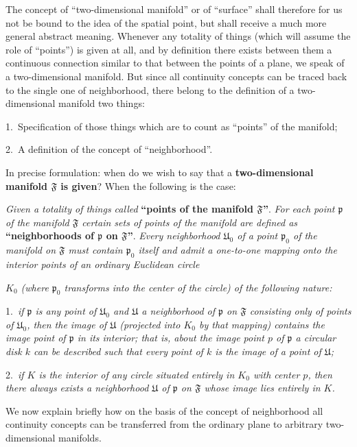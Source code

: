 \documentclass{article}
\begin{document}
The concept of ``two-dimensional manifold'' or of ``surface'' shall therefore for us not be bound to the idea of the spatial point, but shall receive a much more general abstract meaning. Whenever any totality of things (which will assume the role of ``points'') is given at all, and by definition there exists between them a continuous connection similar to that between the points of a plane, we speak of a two-dimensional manifold. But since all continuity concepts can be traced back to the single one of neighborhood, there belong to the definition of a two-dimensional manifold two things:

1.\ Specification of those things which are to count as ``points'' of the manifold;

2.\ A definition of the concept of ``neighborhood''.

In precise formulation: when do we wish to say that a \textbf{two-dimensional manifold $\mathfrak{F}$ is given}? When the following is the case:

\emph{Given a totality of things called} \textbf{``points of the manifold $\mathfrak{F}$''}. \emph{For each point $\mathfrak{p}$ of the manifold $\mathfrak{F}$ certain sets of points of the manifold are defined as} \textbf{``neighborhoods of $\mathfrak{p}$ on $\mathfrak{F}$''}. \emph{Every neighborhood $\mathfrak{U}_0$ of a point $\mathfrak{p}_0$ of the manifold on $\mathfrak{F}$ must contain $\mathfrak{p}_0$ itself and admit a one-to-one mapping onto the interior points of an ordinary Euclidean circle}

\emph{$K_0$ (where $\mathfrak{p}_0$ transforms into the center of the circle) of the following nature:}

1.\ \emph{if $\mathfrak{p}$ is any point of $\mathfrak{U}_0$ and $\mathfrak{U}$ a neighborhood of $\mathfrak{p}$ on $\mathfrak{F}$ consisting only of points of $\mathfrak{U}_0$, then the image of $\mathfrak{U}$ (projected into $K_0$ by that mapping) contains the image point of $\mathfrak{p}$ in its interior; that is, about the image point $p$ of $\mathfrak{p}$ a circular disk $k$ can be described such that every point of $k$ is the image of a point of $\mathfrak{U}$;}

2.\ \emph{if $K$ is the interior of any circle situated entirely in $K_0$ with center $p$, then there always exists a neighborhood $\mathfrak{U}$ of $\mathfrak{p}$ on $\mathfrak{F}$ whose image lies entirely in $K$.}

We now explain briefly how on the basis of the concept of neighborhood all continuity concepts can be transferred from the ordinary plane to arbitrary two-dimensional manifolds.
\end{document}

